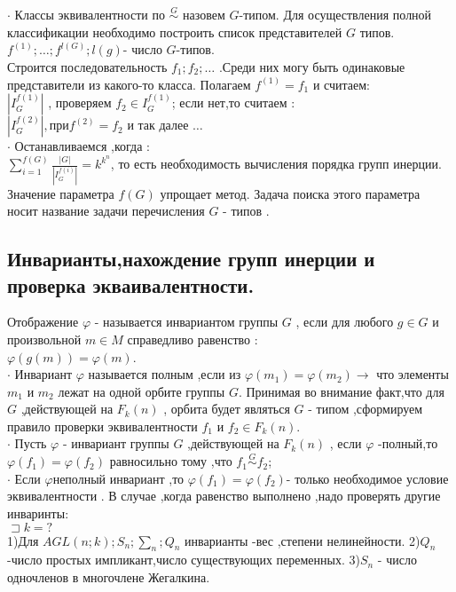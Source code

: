 $\cdot$ Классы эквивалентности по $\stackrel{G}{\sim}$ назовем $G$-типом. Для осуществления полной классификации необходимо построить список представителей $G$ типов.\\
$f^{(1)};\dots ; f^{l(G)}; l(g)$- число $G$-типов.\\
Строится последовательность $f_1;f_2;\dots $ .Среди них могу быть одинаковые представители из какого-то класса. Полагаем $ f^{(1)}=f_1$ и считаем:\\ 
$|I_G^{f(1)}|$ , проверяем $f_2 \in I_G^{f(1)}$; если нет,то считаем :\\
$|I_G^{f(2)}| , при f^{(2)} =f_2$ и так далее $\dots$\\
$\cdot$ Останавливаемся ,когда :\\
$\sum_{i=1}^{f(G)} \frac{|G|}{|I_G^{f(i)}|} = k^{k^n} $, то есть необходимость вычисления порядка групп инерции. Значение параметра $f(G)$ упрощает метод. Задача поиска этого параметра носит название задачи перечисления $G$ - типов .\\

\subsection{Инварианты,нахождение групп инерции и проверка экваивалентности.}

\opr 
Отображение $\varphi$ - называется инвариантом группы $G$ , если для любого $g \in G$ и произвольной $m \in M$ справедливо равенство :\\
$\varphi(g(m))=\varphi(m)$.\\
$\cdot $ Инвариант $\varphi$ называется полным ,если из $\varphi (m_1) = \varphi(m_2) \rightarrow $ что элементы $m_1 $ и $m_2$ лежат на одной орбите группы $G$. Принимая во внимание факт,что для $G$ ,действующей на $F_k(n)$ , орбита будет являться $G$ - типом ,сформируем правило проверки эквивалентности $f_1 $ и $f_2 \in F_k(n)$.\\
$\cdot$ Пусть $\varphi$ - инвариант группы $G$ ,действующей на $F_k(n)$ , если $\varphi$ -полный,то $\varphi(f_1)=\varphi(f_2) $ равносильно тому ,что $f_1 \stackrel{G}{\sim} f_2$;\\
$\cdot$ Если $\varphi$неполный инвариант ,то $\varphi(f_1)=\varphi(f_2) $- только необходимое условие эквивалентности . В случае ,когда равенство выполнено ,надо проверять другие инваринты:\\

$\sqsupset k = ?$\\
1)Для $AGL(n;k);S_n;\sum_n;Q_n $ инварианты -вес ,степени нелинейности.
2)$Q_n$ -число простых импликант,число существующих переменных.
3)$S_n$ - число одночленов в многочлене Жегалкина.\\


